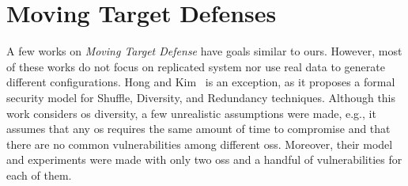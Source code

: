 \section{Moving Target Defenses}
A few works on \emph{Moving Target Defense} have goals similar to ours.
However, most of these works do not focus on replicated system nor use real data to generate different configurations.
Hong and Kim~\cite{Hong:2015} is an exception, as it proposes a formal security model for Shuffle, Diversity, and Redundancy techniques.
Although this work considers \gls{os} diversity, a few unrealistic assumptions were made, e.g., it assumes that any \gls{os} requires the same amount of time to compromise and that there are no common vulnerabilities among different \glspl{os}.
Moreover, their model and experiments were made with only two \glspl{os} and a handful of vulnerabilities for each of them.

